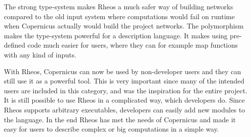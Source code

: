 The strong type-system makes Rheos a much safer way of building
networks compared to the old input system where computations would
fail on runtime when Copernicus actually would build the project
networks. The polymorphism makes the type-system powerful for a
description language. It makes using pre-defined code much easier for
users, where they can for example map functions with any kind of
inputs.

With Rheos, Copernicus can now be used by non-developer users and they
can still use it as a powerful tool. This is very important since many
of the intended users are included in this category, and was the
inspiration for the entire project. It is still possible to use Rheos
in a complicated way, which developers do. Since Rheos supports
arbitrary executables, developers can easily add new modules to the
language. In the end Rheos has met the needs of Copernicus and made it
easy for users to describe complex or big computations in a simple
way.

